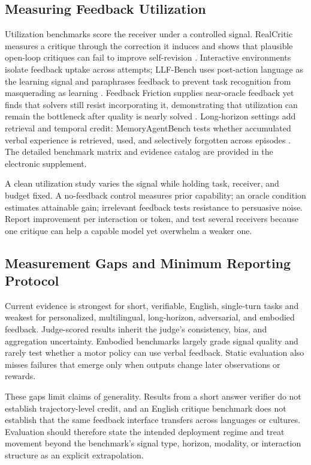 \subsection{Measuring Feedback Utilization}
\label{subsec:eval-utilization}

Utilization benchmarks score the receiver under a controlled signal. RealCritic measures a critique through the correction it induces and shows that plausible open-loop critiques can fail to improve self-revision \citep{tang2025realcritic}. Interactive environments isolate feedback uptake across attempts; LLF-Bench uses post-action language as the learning signal and paraphrases feedback to prevent task recognition from masquerading as learning \citep{cheng2023llfbench}. Feedback Friction supplies near-oracle feedback yet finds that solvers still resist incorporating it, demonstrating that utilization can remain the bottleneck after quality is nearly solved \citep{jiang2025feedback}. Long-horizon settings add retrieval and temporal credit: MemoryAgentBench tests whether accumulated verbal experience is retrieved, used, and selectively forgotten across episodes \citep{hu2025evaluating}. The detailed benchmark matrix and evidence catalog are provided in the electronic supplement.

A clean utilization study varies the signal while holding task, receiver, and budget fixed. A no-feedback control measures prior capability; an oracle condition estimates attainable gain; irrelevant feedback tests resistance to persuasive noise. Report improvement per interaction or token, and test several receivers because one critique can help a capable model yet overwhelm a weaker one.

\subsection{Measurement Gaps and Minimum Reporting Protocol}
\label{subsec:eval-gaps}

Current evidence is strongest for short, verifiable, English, single-turn tasks and weakest for personalized, multilingual, long-horizon, adversarial, and embodied feedback. Judge-scored results inherit the judge's consistency, bias, and aggregation uncertainty. Embodied benchmarks largely grade signal quality and rarely test whether a motor policy can use verbal feedback. Static evaluation also misses failures that emerge only when outputs change later observations or rewards.

These gaps limit claims of generality. Results from a short answer verifier do not establish trajectory-level credit, and an English critique benchmark does not establish that the same feedback interface transfers across languages or cultures. Evaluation should therefore state the intended deployment regime and treat movement beyond the benchmark's signal type, horizon, modality, or interaction structure as an explicit extrapolation.

